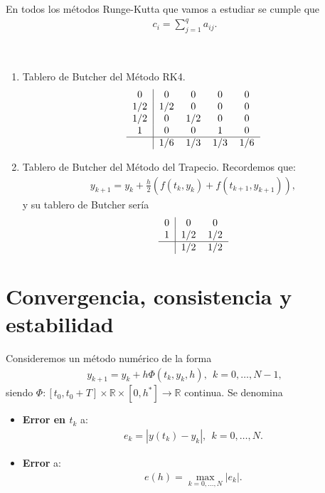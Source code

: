 \begin{obs}
En todos los métodos Runge-Kutta que vamos a estudiar se cumple que
\begin{align*}
    c_i = \sum_{j=1}^{q} a_{ij}.
\end{align*}
\end{obs}

\begin{ejemplo} \
\begin{enumerate}
    \item Tablero de Butcher del Método RK4.
    \begin{align*}
        \begin{tabular}{c|cccc}
0   & 0   & 0   & 0   & 0   \\
1/2 & 1/2 & 0   & 0   & 0   \\
1/2 & 0   & 1/2 & 0   & 0   \\
1   & 0   & 0   & 1   & 0   \\ \hline
    & 1/6 & 1/3 & 1/3 & 1/6
\end{tabular}
    \end{align*}
    \item Tablero de Butcher del Método del Trapecio. Recordemos que:
    \begin{align*}
        y_{k+1} = y_k + \frac{h}{2}(f(t_k,y_k) + f(t_{k+1},y_{k+1})),
    \end{align*}
    y su tablero de Butcher sería
    \begin{align*}
        \begin{tabular}{c|cc}
0 & 0   & 0   \\
1 & 1/2 & 1/2 \\ \hline
  & 1/2 & 1/2
\end{tabular}
    \end{align*}
\end{enumerate}
\end{ejemplo}

\section{Convergencia, consistencia y estabilidad}

\begin{defi}
Consideremos un método numérico de la forma
\begin{align*}
    y_{k+1} = y_k + h \Phi(t_k,y_k,h), \ \ k = 0,\ldots,N-1,
\end{align*}
siendo $\Phi : [t_0,t_0+T] \times \mathbb{R} \times [0,h^*] \longrightarrow \mathbb{R}$ continua. Se denomina
\begin{itemize}
    \item \textbf{Error en $t_k$} a:
    \begin{align*}
        e_k = |y(t_k) - y_k|, \ \ k = 0,\ldots,N.
    \end{align*}
    \item \textbf{Error} a:
    \begin{align*}
        e(h) = \max_{k = 0,\ldots,N} |e_k|.
    \end{align*}
\end{itemize}
\end{defi}

